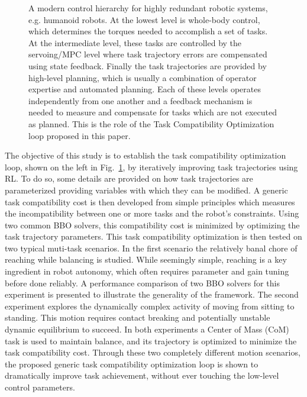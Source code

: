 \documentclass[12pt,a4paper,twoside]{article}
\begin{document}
\begin{figure}[!h]
\begin{minipage}[c]{0.5\textwidth}
\begin{tikzpicture}[node distance=1cm, auto,]
    \end{tikzpicture}
  	\end{minipage}\hfill
  \begin{minipage}[c]{0.47\textwidth}
      \setlength{\belowcaptionskip}{-12pt}
    \caption{A modern control hierarchy for highly redundant robotic systems, e.g. humanoid robots. At the lowest level is whole-body control, which determines the torques needed to accomplish a set of tasks. At the intermediate level, these tasks are controlled by the servoing/MPC level where task trajectory errors are compensated using state feedback. Finally the task trajectories are provided by high-level planning, which is usually a combination of operator expertise and automated planning. Each of these levels operates independently from one another and a feedback mechanism is needed to measure and compensate for tasks which are not executed as planned. This is the role of the Task Compatibility Optimization loop proposed in this paper.}
\label{fig:control_diagram}
  \end{minipage}
\end{figure}

The objective of this study is to establish the task compatibility optimization loop, shown on the left in Fig.~\ref{fig:control_diagram}, by iteratively improving task trajectories using RL. To do so, some details are provided on how task trajectories are parameterized providing variables with which they can be modified. A generic task compatibility cost is then developed from simple principles which measures the incompatibility between one or more tasks and the robot's constraints. Using two common BBO solvers, this compatibility cost is minimized by optimizing the task trajectory parameters. This task compatibility optimization is then tested on two typical muti-task scenarios. In the first scenario the relatively banal chore of reaching while balancing is studied. While seemingly simple, reaching is a key ingredient in robot autonomy, which often requires parameter and gain tuning before done reliably. A performance comparison of two BBO solvers for this experiment is presented to illustrate the generality of the framework. The second experiment explores the dynamically complex activity of moving from sitting to standing. This motion requires contact breaking and potentially unstable dynamic equilibrium to succeed. In both experiments a Center of Mass (CoM) task is used to maintain balance, and its trajectory is optimized to minimize the task compatibility cost. Through these two completely different motion scenarios, the proposed generic task compatibility optimization loop is shown to dramatically improve task achievement, without ever touching the low-level control parameters.
\end{document}

